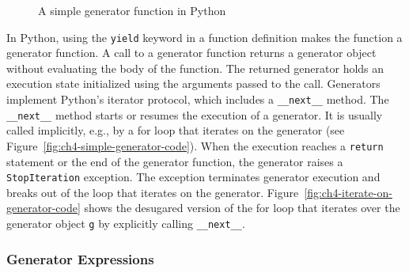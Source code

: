 \begin{figure}
\centering
{}
\caption{A simple generator function in Python}
\label{fig:ch4-generator-example}
\end{figure}

In Python, using the \texttt{yield} keyword in a function definition makes the function a generator function.
A call to a generator function returns a generator object without evaluating the body of the function.
The returned generator holds an execution state initialized using the arguments passed to the call.
Generators implement Python's iterator protocol, which includes a \texttt{\_\_next\_\_} method.
The \texttt{\_\_next\_\_} method starts or resumes the execution of a generator.
It is usually called implicitly, e.g., by a for loop that iterates on the generator (see Figure~\ref{fig:ch4-simple-generator-code}).
When the execution reaches a \texttt{return} statement or the end of the generator function, the generator raises a \texttt{StopIteration} exception.
The exception terminates generator execution and breaks out of the loop that iterates on the generator.
Figure~\ref{fig:ch4-iterate-on-generator-code} shows the desugared version of the for loop that iterates over the generator object \texttt{g} by explicitly calling \texttt{\_\_next\_\_}.

\subsubsection*{Generator Expressions}


